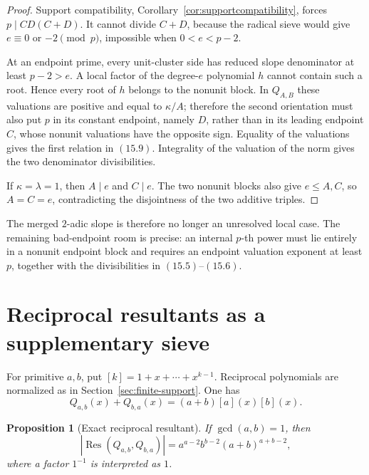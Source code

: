 \documentclass[11pt]{article}
\newtheorem{proposition}[theorem]{Proposition}
\theoremstyle{definition}
\newcommand{\Res}{\operatorname{Res}}
\begin{document}
\begin{proof}
Support compatibility, Corollary~\ref{cor:supportcompatibility}, forces
\(p\mid CD(C+D)\).  It cannot divide \(C+D\), because the radical sieve
would give \(e\equiv0\) or \(-2\pmod p\), impossible when
\(0<e<p-2\).

At an endpoint prime, every unit-cluster side has reduced slope denominator
at least \(p-2>e\).  A local factor of the degree-\(e\) polynomial \(h\)
cannot contain such a root.  Hence every root of \(h\) belongs to the
nonunit block.  In \(Q_{A,B}\) these valuations are positive and equal to
\(\kappa/A\); therefore the second orientation must also put \(p\) in its
constant endpoint, namely \(D\), rather than in its leading endpoint
\(C\), whose nonunit valuations have the opposite sign.  Equality of the
valuations gives the first relation in \((15.9)\).  Integrality of the
valuation of the norm gives the two denominator divisibilities.

If \(\kappa=\lambda=1\), then \(A\mid e\) and \(C\mid e\).  The two
nonunit blocks also give \(e\leq A,C\), so \(A=C=e\), contradicting the
disjointness of the two additive triples.
\end{proof}

The merged \(2\)-adic slope is therefore no longer an unresolved local
case.  The remaining bad-endpoint room is precise: an internal \(p\)-th
power must lie entirely in a nonunit endpoint block and requires an endpoint
valuation exponent at least \(p\), together with the divisibilities in
\((15.5)\)--\((15.6)\).

\section{Reciprocal resultants as a supplementary sieve}

For primitive \(a,b\), put \([k]=1+x+\cdots+x^{k-1}\).  Reciprocal
polynomials are normalized as in Section~\ref{sec:finite-support}.  One has
\begin{equation}
 Q_{a,b}(x)+Q_{b,a}(x)=(a+b)[a](x)[b](x).
 \tag{16.1}
\end{equation}

\begin{proposition}[Exact reciprocal resultant]
If \(\gcd(a,b)=1\), then
\begin{equation}
 \left|\Res(Q_{a,b},Q_{b,a})\right|
 =a^{a-2}b^{b-2}(a+b)^{a+b-2},
 \tag{16.2}
\end{equation}
where a factor \(1^{-1}\) is interpreted as \(1\).
\end{proposition}
\end{document}
